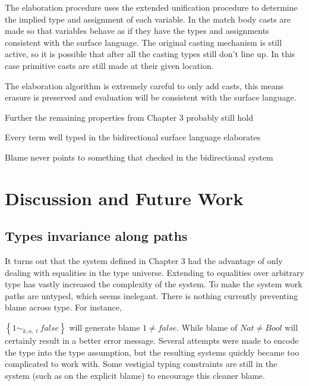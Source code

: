 The elaboration procedure uses the extended unification procedure
to determine the implied type and assignment of each variable. In
the match body casts are made so that variables behave as if they
have the types and assignments consistent with the surface language.
The original casting mechanism is still active, so it is possible
that after all the casting types still don't line up. In this case
primitive casts are still made at their given location.


The elaboration algorithm is extremely careful to only add casts,
this means erasure is preserved and evaluation will be consistent
with the surface language.

Further the remaining properties from Chapter 3 probably still hold
\begin{conjecture}
Every term well typed in the bidirectional surface language elaborates 
\end{conjecture}

\begin{conjecture}
Blame never points to something that checked in the bidirectional
system 
\end{conjecture}


\section{Discussion and Future Work}


\subsection{Types invariance along paths}

It turns out that the system defined in Chapter 3 had the advantage
of only dealing with equalities in the type universe. Extending to
equalities over arbitrary type has vastly increased the complexity
of the system. To make the system work paths are untyped, which seems
inelegant. There is nothing currently preventing blame across type.
For instance,

$\left\{ 1\sim_{k,o,\ell}false\right\} $ will generate blame $1\neq false$.
While blame of $Nat\neq Bool$ will certainly result in a better error
message. Several attempts were made to encode the type into the type
assumption, but the resulting systems quickly became too complicated
to work with. Some vestigial typing constraints are still in the system
(such as on the explicit blame) to encourage this cleaner blame.

